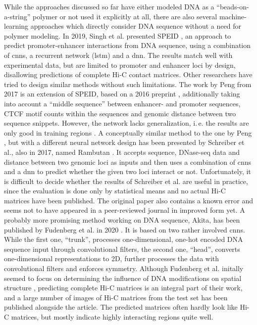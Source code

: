 While the approaches discussed so far have either modeled DNA as a ``beads-on-a-string'' polymer or not used it explicitly at all,
there are also several machine-learning approaches which directly consider DNA sequence without a need for polymer modeling.
In 2019, Singh et al. presented SPEID \cite{Singh2019}, an approach to predict promoter-enhancer interactions from DNA sequence,
using a combination of \acrshort{cnn}s, a recurrent network (\acrshort{lstm}) and a \acrshort{dnn}.
The results match well with experimental data, but are limited to promoter and enhancer loci by design, disallowing predictions of complete Hi-C contact matrices.
Other researchers have tried to design similar methods without such limitations.
The work by Peng from 2017 \cite{peng2017} is an extension of SPEID, based on a 2016 preprint \cite{Singh2016}, 
additionally taking into account a ``middle sequence'' between enhancer- and promoter sequences,
CTCF motif counts within the sequences and genomic distance between two sequence snippets. 
However, the network lacks generalization, i.\,e. the results are only good in training regions \cite[figs. 4, 5]{peng2017}.
A conceptually similar method to the one by Peng \cite{peng2017}, but with a different neural network design has been presented by Schreiber et al., also in 2017, named Rambutan \cite{Schreiber2017}.
It accepts sequence, DNase-seq data and distance between two genomic loci as inputs 
and then uses a combination of \acrshort{cnn}s and a \acrshort{dnn} to predict whether the given two loci interact or not. 
Unfortunately, it is difficult to decide whether the results of Schreiber et al. are useful in practice, since the evaluation is done only by statistical means 
and no actual Hi-C matrices have been published.
The original paper \cite{Schreiber2017} also contains a known error and seems not to have appeared in a peer-reviewed journal in improved form 
yet. 
A probably more promising method working on DNA sequence, Akita, has been published by Fudenberg et al. in 2020 \cite{Fudenberg2020}.
It is based on two rather involved \acrlong{cnn}s. 
While the first one, ``trunk'', processes one-dimensional, one-hot encoded DNA sequence input through convolutional filters, the second one, ``head'', 
converts one-dimensional representations to 2D, further processes the data with convolutional filters and enforces symmetry.
Although Fudenberg et al. initally seemed to focus on determining the influence of DNA modifications on spatial structure \cite{Fudenberg2019},
predicting complete Hi-C matrices is an integral part of their work, 
and a large number of images of Hi-C matrices from the test set has been published alongside the article. 
The predicted matrices often hardly look like Hi-C matrices, but mostly indicate highly interacting regions quite well.

